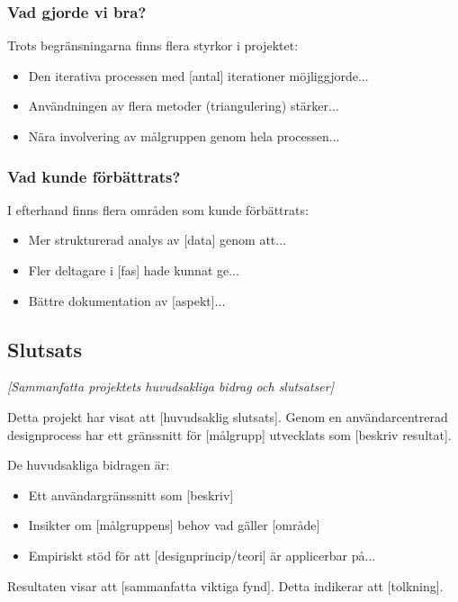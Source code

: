 \subsubsection{Vad gjorde vi bra?}

Trots begränsningarna finns flera styrkor i projektet:

\begin{itemize}
    \item Den iterativa processen med [antal] iterationer möjliggjorde...
    \item Användningen av flera metoder (triangulering) stärker...
    \item Nära involvering av målgruppen genom hela processen...
\end{itemize}


\subsubsection{Vad kunde förbättrats?}

I efterhand finns flera områden som kunde förbättrats:

\begin{itemize}
    \item Mer strukturerad analys av [data] genom att...
    \item Fler deltagare i [fas] hade kunnat ge...
    \item Bättre dokumentation av [aspekt]...
\end{itemize}


\subsection{Slutsats}

\textit{[Sammanfatta projektets huvudsakliga bidrag och slutsatser]}

Detta projekt har visat att [huvudsaklig slutsats]. Genom en användarcentrerad designprocess har ett gränssnitt för [målgrupp] utvecklats som [beskriv resultat].

De huvudsakliga bidragen är:
\begin{itemize}
    \item Ett användargränssnitt som [beskriv]
    \item Insikter om [målgruppens] behov vad gäller [område]
    \item Empiriskt stöd för att [designprincip/teori] är applicerbar på...
\end{itemize}

Resultaten visar att [sammanfatta viktiga fynd]. Detta indikerar att [tolkning].



